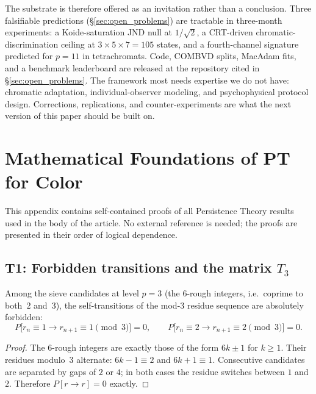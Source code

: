 \documentclass[12pt,a4paper]{article}
\begin{document}
The substrate is therefore offered as an invitation rather than a
conclusion. Three falsifiable predictions (\S\ref{sec:open_problems})
are tractable in three-month experiments: a Koide-saturation JND null
at $1/\sqrt{2}$, a CRT-driven chromatic-discrimination ceiling at
$3\times 5\times 7 = 105$ states, and a fourth-channel signature
predicted for $p = 11$ in tetrachromats. Code, COMBVD splits, MacAdam
fits, and a benchmark leaderboard are released at the repository cited
in \S\ref{sec:open_problems}. The framework most needs expertise we
do not have: chromatic adaptation, individual-observer modeling, and
psychophysical protocol design. Corrections, replications, and
counter-experiments are what the next version of this paper should be
built on.

\appendix
\section{Mathematical Foundations of PT for Color}
\label{app:pt_proofs}

This appendix contains self-contained proofs of all Persistence Theory
results used in the body of the article. No external reference is
needed; the proofs are presented in their order of logical dependence.

\subsection{T1: Forbidden transitions and the matrix $T_3$}
\label{app:T1}

\begin{theorembox}
Among the sieve candidates at level $p = 3$ (the $6$-rough integers,
i.e.\ coprime to both~$2$ and~$3$), the self-transitions of the mod-$3$
residue sequence are absolutely forbidden:
\begin{equation}
  P\bigl[r_n \equiv 1 \to r_{n+1} \equiv 1 \pmod{3}\bigr] = 0, \qquad
  P\bigl[r_n \equiv 2 \to r_{n+1} \equiv 2 \pmod{3}\bigr] = 0.
  \tag{A.1}
\end{equation}

\begin{proof}
The $6$-rough integers are exactly those of the form $6k \pm 1$ for
$k \geq 1$. Their residues modulo~$3$ alternate: $6k - 1 \equiv 2$
and $6k + 1 \equiv 1$. Consecutive candidates are separated by gaps
of $2$ or $4$; in both cases the residue switches between $1$ and $2$.
Therefore $P[r \to r] = 0$ exactly.
\end{proof}
\end{theorembox}
\end{document}
